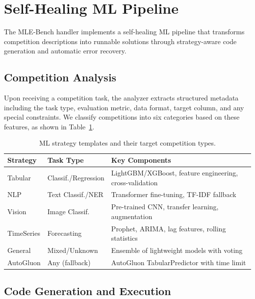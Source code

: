 \documentclass[11pt]{article}
\begin{document}
\section{Self-Healing ML Pipeline}
\label{sec:ml}

The MLE-Bench handler implements a self-healing ML pipeline that transforms competition descriptions into runnable solutions through strategy-aware code generation and automatic error recovery.

\subsection{Competition Analysis}

Upon receiving a competition task, the analyzer extracts structured metadata including the task type, evaluation metric, data format, target column, and any special constraints. We classify competitions into six categories based on these features, as shown in Table~\ref{tab:strategies}.

\begin{table}[t]
\centering
\caption{ML strategy templates and their target competition types.}
\label{tab:strategies}
\begin{tabular}{@{}ll>{\raggedright\arraybackslash}p{5.5cm}@{}}
\toprule
\textbf{Strategy} & \textbf{Task Type} & \textbf{Key Components} \\
\midrule
Tabular     & Classif./Regression & LightGBM/XGBoost, feature engineering, cross-validation \\
NLP         & Text Classif./NER   & Transformer fine-tuning, TF-IDF fallback \\
Vision      & Image Classif.      & Pre-trained CNN, transfer learning, augmentation \\
TimeSeries  & Forecasting         & Prophet, ARIMA, lag features, rolling statistics \\
General     & Mixed/Unknown       & Ensemble of lightweight models with voting \\
AutoGluon   & Any (fallback)      & AutoGluon TabularPredictor with time limit \\
\bottomrule
\end{tabular}
\end{table}

\subsection{Code Generation and Execution}
\end{document}
